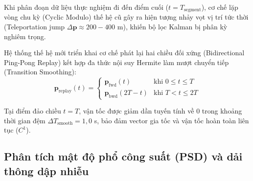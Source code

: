 \hspace{0.5cm} Khi phân đoạn dữ liệu thực nghiệm đi đến điểm cuối ($t = T_{\text{segment}}$), cơ chế lặp vòng chu kỳ (Cyclic Modulo) thế hệ cũ gây ra hiện tượng nhảy vọt vị trí tức thời (Teleportation jump $\Delta \mathbf{p} \approx 200 - 400$ m), khiến bộ lọc Kalman bị phân kỳ nghiêm trọng.

Hệ thống thế hệ mới triển khai cơ chế phát lại hai chiều đối xứng (Bidirectional Ping-Pong Replay) kết hợp đa thức nội suy Hermite làm mượt chuyển tiếp (Transition Smoothing):
\begin{equation}
\mathbf{p}_{\text{replay}}(t) = \begin{cases}
\mathbf{p}_{\text{fwd}}(t) & \text{khi } 0 \le t \le T \\
\mathbf{p}_{\text{bwd}}(2T - t) & \text{khi } T < t \le 2T
\end{cases}
\label{eq:bidirectional-replay-piecewise}
\end{equation}

Tại điểm đảo chiều $t = T$, vận tốc được giảm dần tuyến tính về 0 trong khoảng thời gian đệm $\Delta T_{\text{smooth}} = 1{,}0$ s, bảo đảm vector gia tốc và vận tốc hoàn toàn liên tục ($C^1$).

\begin{table}[H]
\centering
\caption{So sánh sai số và tính ổn định tại vùng chuyển tiếp giữa các cơ chế lặp vòng}
\label{tab:replay-transition-stability}
\end{table}

\subsection{Phân tích mật độ phổ công suất (PSD) và dải thông dập nhiễu}

